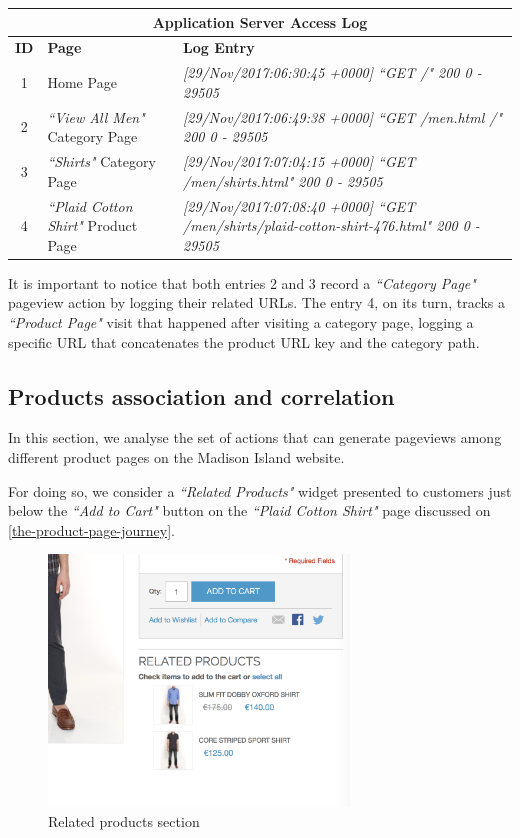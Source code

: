\vspace{0.5cm}
\begin{center}
  \begin{tabular}{|c|p{3cm}|p{10cm}|}
  \hline
  \multicolumn{3}{|c|}{Application Server Access Log}\\ \hline
  \textbf{ID}&\textbf{Page}&\textbf{Log Entry}   \\ \hline
  1&Home Page&\em[29/Nov/2017:06:30:45 +0000] ``GET /" 200 0 - 29505 \\ \hline
  2&\textit{``View All Men"} Category Page &\em[29/Nov/2017:06:49:38 +0000] ``GET /men.html /" 200 0 - 29505 
  \\ \hline
  3&\textit{``Shirts"} Category Page &\em[29/Nov/2017:07:04:15 +0000] ``GET /men/shirts.html" 200 0 - 29505
  \\ \hline
  4&\textit{``Plaid Cotton Shirt"} Product Page &\em[29/Nov/2017:07:08:40 +0000] ``GET /men/shirts/plaid-cotton-shirt-476.html" 200 0 - 29505
  \\ \hline
  \end{tabular}
  \end{center}
  \vspace{0.5cm}

  It is important to notice that both entries 2 and 3 record a \textit{``Category Page"} pageview action by logging their related URLs. The entry 4, on its turn, tracks a \textit{``Product Page"} visit that happened after visiting a category page, logging a specific URL that concatenates the product URL key and the category path. 


\subsection{Products association and correlation}

In this section, we analyse the set of actions that can generate pageviews among different product pages on the Madison Island website. 

For doing so, we consider a \textit{``Related Products"} widget presented to customers just below the \textit{``Add to Cart"} button on the \textit{``Plaid Cotton Shirt"} page discussed on \ref{the-product-page-journey}.

\vspace{0.5cm}
\begin{figure}[H]
  \centering
    \includegraphics[width=8cm]{images/madison/related-products.png}
  \caption{Related products section}
  \label{fig:related-products}
\end{figure}
\vspace{0.5cm}

